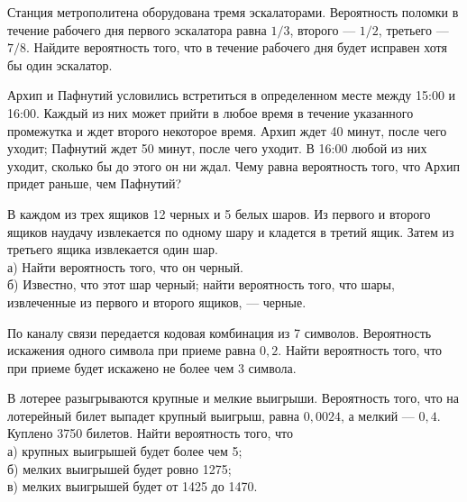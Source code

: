 \newpage\setcounter{zad}{0}



\begin{zkrW}{20}\noindent 
	Станция метрополитена оборудована тремя эскалаторами. Вероятность поломки в течение рабочего дня первого эскалатора равна $1/3$, второго --- $1/2$, третьего ---  $7/8$. Найдите вероятность того, что в течение рабочего дня будет исправен хотя бы один эскалатор.
 
\end{zkrW}

\begin{zkrW}{20}\noindent 
	Архип и Пафнутий условились встретиться в определенном месте между 15:00 и 16:00. Каждый из них может прийти в любое время в течение указанного промежутка и ждет второго некоторое время. Архип ждет 40 минут, после чего уходит; Пафнутий ждет 50 минут, после чего уходит. В 16:00 любой из них уходит, сколько бы до этого он ни ждал. Чему равна вероятность того, что Архип придет раньше, чем Пафнутий?
 
\end{zkrW}

\begin{zkrW}{20}\noindent 
	В каждом из трех ящиков 12 черных и 5 белых шаров. Из первого и второго ящиков наудачу извлекается по одному шару и кладется в третий ящик. Затем из третьего ящика извлекается один шар. \\ \indent а) Найти вероятность того, что он черный. \\ \indent б) Известно, что этот шар черный; найти вероятность того, что шары, извлеченные из первого и второго ящиков, --- черные.
 
\end{zkrW}

\begin{zkrW}{20}\noindent 
	По каналу связи передается кодовая комбинация из 7 символов. Вероятность искажения одного символа при приеме равна $0{,}2$. Найти вероятность того, что при приеме будет искажено не более чем 3 символа.
 
\end{zkrW}

\begin{zkrW}{20}\noindent 
	В лотерее разыгрываются крупные и мелкие выигрыши. Вероятность того, что на лотерейный билет выпадет крупный выигрыш, равна $0{,}0024$, а мелкий --- $0{,}4$. Куплено 3750 билетов. Найти вероятность того, что \\ \indent а) крупных выигрышей будет более чем 5; \\ \indent б) мелких выигрышей будет ровно 1275; \\ \indent в) мелких выигрышей будет от 1425 до 1470.
 
\end{zkrW}

